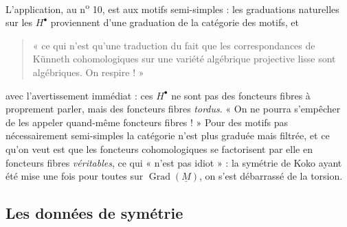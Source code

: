 \documentclass[11pt,a4paper]{article}
\begin{document}
L'application, au n\textsuperscript{o} 10, est aux motifs semi-simples : les
graduations naturelles sur les $H^{\bullet}$ proviennent d'une graduation de la
catégorie des motifs, et
\begin{quote}
« ce qui n'est qu'une traduction du fait que les correspondances de Künneth
cohomologiques sur une variété algébrique projective lisse sont algébriques.
On respire ! »
\end{quote}
avec l'avertissement immédiat : ces $H^{\bullet}$ ne sont pas des foncteurs
fibres à proprement parler, mais des foncteurs fibres \emph{tordus}. « On ne
pourra s'empêcher de les appeler quand-même foncteurs fibres ! » Pour des
motifs pas nécessairement semi-simples la catégorie n'est plus graduée mais
filtrée, et ce qu'on veut est que les foncteurs cohomologiques se factorisent
par elle en foncteurs fibres \emph{véritables}, ce qui « n'est pas idiot » :
la symétrie de Koko ayant été mise une fois pour toutes sur
$\operatorname{Grad}(\underline{M})$, on s'est débarrassé de la torsion.

\subsection*{Les données de symétrie}
\end{document}
